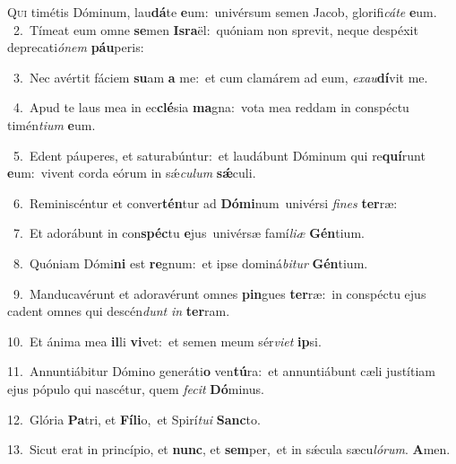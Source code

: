 \lettrine{\initial\textcolor{\initialcolor}{Q}}{ui} timétis Dóminum, lau\-\textbf{dá}\-te \textbf{e}\-um:~\star univérsum semen Jacob, glorifi\-\textit{cá}\-\textit{te} \textbf{e}\-um.\\
{\numbfont\textcolor{\numbcolor}{~2.}}~Tímeat eum omne \textbf{se}\-men \textbf{Is}\-\textbf{ra}ël:~\star quóniam non sprevit, neque despéxit deprecati\-\textit{ó}\-\textit{nem} \textbf{páu}\-peris:\par
{\numbfont\textcolor{\numbcolor}{~3.}}~Nec avértit fáciem \textbf{su}\-am \textbf{a} me:~\star et cum clamárem ad eum, \textit{ex}\-\textit{au}\textbf{dí}vit me.\par
{\numbfont\textcolor{\numbcolor}{~4.}}~Apud te laus mea in ec\-\textbf{clé}\-sia \textbf{ma}\-gna:~\star vota mea reddam in conspéctu timén\-\textit{ti}\-\textit{um} \textbf{e}\-um.\par
{\numbfont\textcolor{\numbcolor}{~5.}}~Edent páuperes, et saturabúntur:~\dagger et laudábunt Dóminum qui re\-\textbf{quí}\-runt \textbf{e}\-um:~\star vivent corda eórum in sǽ\-\textit{cu}\-\textit{lum} \textbf{sǽ}\-culi.\par
{\numbfont\textcolor{\numbcolor}{~6.}}~Reminiscéntur et conver\-\textbf{tén}\-tur ad \textbf{Dó}\-\textbf{mi}num~\star univérsi \textit{fi}\-\textit{nes} \textbf{ter}\-ræ:\par
{\numbfont\textcolor{\numbcolor}{~7.}}~Et adorábunt in con\-\textbf{spéc}\-tu \textbf{e}\-jus~\star univérsæ famí\-\textit{li}\-\textit{æ} \textbf{Gén}\-tium.\par
{\numbfont\textcolor{\numbcolor}{~8.}}~Quóniam Dómi\textbf{ni} est \textbf{re}\-gnum:~\star et ipse dominá\-\textit{bi}\-\textit{tur} \textbf{Gén}\-tium.\par
{\numbfont\textcolor{\numbcolor}{~9.}}~Manducavérunt et adoravérunt omnes \textbf{pin}\-gues \textbf{ter}\-ræ:~\star in conspéctu ejus cadent omnes qui descén\textit{dunt} \textit{in} \textbf{ter}\-ram.\par
{\numbfont\textcolor{\numbcolor}{10.}}~Et ánima mea \textbf{il}\-li \textbf{vi}\-vet:~\star et semen meum sér\-\textit{vi}\-\textit{et} \textbf{ip}\-si.\par
{\numbfont\textcolor{\numbcolor}{11.}}~Annuntiábitur Dómino generáti\textbf{o} ven\-\textbf{tú}\-ra:~\star et annuntiábunt cæli justítiam ejus pópulo qui nascétur, quem \textit{fe}\-\textit{cit} \textbf{Dó}\-minus.\par
{\numbfont\textcolor{\numbcolor}{12.}}~Glória \textbf{Pa}\-tri, et \textbf{Fí}\-\textbf{li}o,~\star et Spirí\-\textit{tu}\-\textit{i} \textbf{Sanc}\-to.\par
{\numbfont\textcolor{\numbcolor}{13.}}~Sicut erat in princípio, et \textbf{nunc}\-, et \textbf{sem}\-per,~\star et in sǽcula sæcu\-\textit{ló}\-\textit{rum}. \textbf{A}\-men.\par
